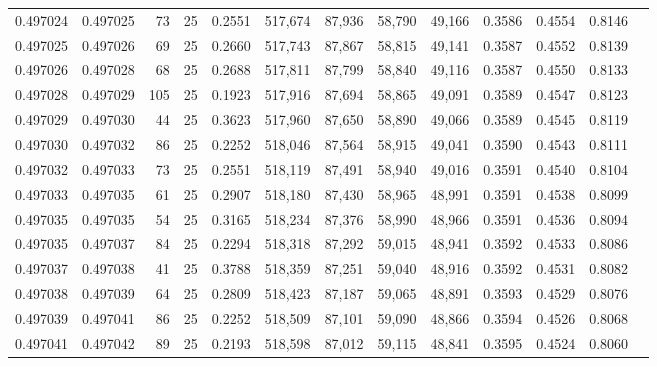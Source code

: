 \begin{tabular}{rrrrrrrrrrrrr}
0.497024 & 0.497025 &    73 &  25 &                                     0.2551 & 517,674 &  87,936 &  58,790 &  49,166 & 0.3586 & 0.4554 & 0.8146 \\
0.497025 & 0.497026 &    69 &  25 &                                     0.2660 & 517,743 &  87,867 &  58,815 &  49,141 & 0.3587 & 0.4552 & 0.8139 \\
0.497026 & 0.497028 &    68 &  25 &                                     0.2688 & 517,811 &  87,799 &  58,840 &  49,116 & 0.3587 & 0.4550 & 0.8133 \\
0.497028 & 0.497029 &   105 &  25 &                                     0.1923 & 517,916 &  87,694 &  58,865 &  49,091 & 0.3589 & 0.4547 & 0.8123 \\
0.497029 & 0.497030 &    44 &  25 &                                     0.3623 & 517,960 &  87,650 &  58,890 &  49,066 & 0.3589 & 0.4545 & 0.8119 \\
0.497030 & 0.497032 &    86 &  25 &                                     0.2252 & 518,046 &  87,564 &  58,915 &  49,041 & 0.3590 & 0.4543 & 0.8111 \\
0.497032 & 0.497033 &    73 &  25 &                                     0.2551 & 518,119 &  87,491 &  58,940 &  49,016 & 0.3591 & 0.4540 & 0.8104 \\
0.497033 & 0.497035 &    61 &  25 &                                     0.2907 & 518,180 &  87,430 &  58,965 &  48,991 & 0.3591 & 0.4538 & 0.8099 \\
0.497035 & 0.497035 &    54 &  25 &                                     0.3165 & 518,234 &  87,376 &  58,990 &  48,966 & 0.3591 & 0.4536 & 0.8094 \\
0.497035 & 0.497037 &    84 &  25 &                                     0.2294 & 518,318 &  87,292 &  59,015 &  48,941 & 0.3592 & 0.4533 & 0.8086 \\
0.497037 & 0.497038 &    41 &  25 &                                     0.3788 & 518,359 &  87,251 &  59,040 &  48,916 & 0.3592 & 0.4531 & 0.8082 \\
0.497038 & 0.497039 &    64 &  25 &                                     0.2809 & 518,423 &  87,187 &  59,065 &  48,891 & 0.3593 & 0.4529 & 0.8076 \\
0.497039 & 0.497041 &    86 &  25 &                                     0.2252 & 518,509 &  87,101 &  59,090 &  48,866 & 0.3594 & 0.4526 & 0.8068 \\
0.497041 & 0.497042 &    89 &  25 &                                     0.2193 & 518,598 &  87,012 &  59,115 &  48,841 & 0.3595 & 0.4524 & 0.8060 \\

\end{tabular}
